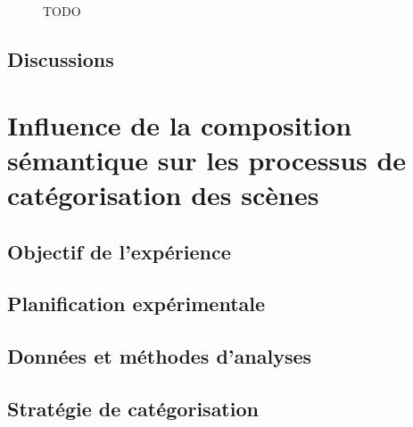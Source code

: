 \begin{figure}[t]
        \caption[TODO]{TODO}\label{fig:soundlevelSansMarker}
\end{figure}

\subsection{Discussions}


\section[Composition sémantique et catégorisation]{Influence de la composition sémantique sur les processus de catégorisation des scènes}
\label{sec:xp4}

\subsection{Objectif de l'expérience}

\subsection{Planification expérimentale}

\subsection{Données et méthodes d'analyses}

\subsection{Stratégie de catégorisation}

